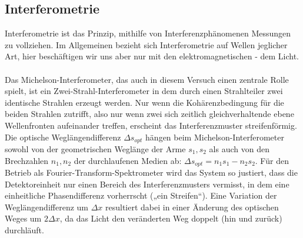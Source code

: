 \documentclass[10pt,a4paper]{article}
\begin{document}
\subsection{Interferometrie}
Interferometrie ist das Prinzip, mithilfe von Interferenzphänomenen Messungen zu vollziehen. Im Allgemeinen bezieht sich Interferometrie auf Wellen jeglicher Art, hier beschäftigen wir uns aber nur mit den elektromagnetischen - dem Licht. \cite{1}\\\\
Das Michelson-Interferometer, das auch in diesem Versuch einen zentrale Rolle spielt, ist ein Zwei-Strahl-Interferometer in dem durch einen Strahlteiler zwei identische Strahlen erzeugt werden. Nur wenn die Kohärenzbedingung für die beiden Strahlen zutrifft, also nur wenn zwei sich zeitlich gleichverhaltende ebene Wellenfronten aufeinander treffen, erscheint das Interferenzmuster streifenförmig. \cite{2}\\
Die optische Weglängendifferenz $\Delta s_{opt}$ hängen beim Michelson-Interferometer sowohl von der geometrischen Weglänge der Arme $s_1, s_2$ als auch von den Brechzahlen $n_1, n_2$ der durchlaufenen Medien ab: $\Delta s_{opt} = n_1s_1 - n_2s_2$. Für den Betrieb als Fourier-Transform-Spektrometer wird das System so justiert, dass die Detektoreinheit nur einen Bereich des Interferenzmusters vermisst, in dem eine einheitliche Phasendifferenz vorherrscht („ein Streifen“). Eine Variation der Weglängendifferenz um $\Delta x$ resultiert dabei in einer Änderung des optischen Weges um $2\Delta x$, da das Licht den veränderten Weg doppelt (hin und zurück) durchläuft. \cite{1}
\end{document}
